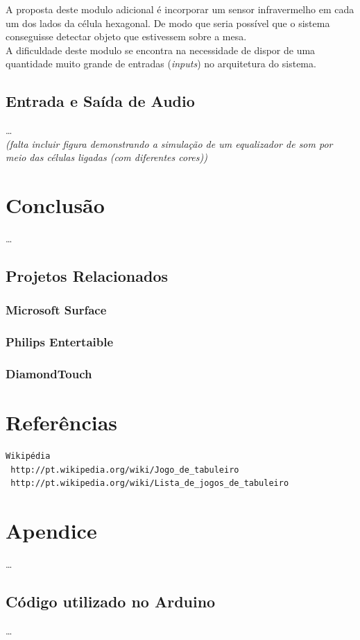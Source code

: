 \documentclass[a4paper,10pt]{article}
\begin{document}
A proposta deste modulo adicional é incorporar um sensor infravermelho em cada um dos lados da célula hexagonal. De modo que seria possível que o sistema conseguisse detectar objeto que estivessem sobre a mesa. \\

A dificuldade deste modulo se encontra na necessidade de dispor de uma quantidade muito grande de entradas ({\it inputs}) no arquitetura do sistema.

\subsection{Entrada e Saída de Audio}

\ldots \\

{\it (falta incluir figura demonstrando a simulação de um equalizador de som por meio das células ligadas (com diferentes cores))}

\section{Conclusão}

\ldots

\subsection{Projetos Relacionados}

\subsubsection{Microsoft Surface}
\subsubsection{Philips Entertaible}
\subsubsection{DiamondTouch}

\section{Referências}

\begin{verbatim}
Wikipédia
 http://pt.wikipedia.org/wiki/Jogo_de_tabuleiro
 http://pt.wikipedia.org/wiki/Lista_de_jogos_de_tabuleiro 
\end{verbatim}

\section{Apendice}

\ldots

\subsection{Código utilizado no Arduino}

\ldots
\end{document}
